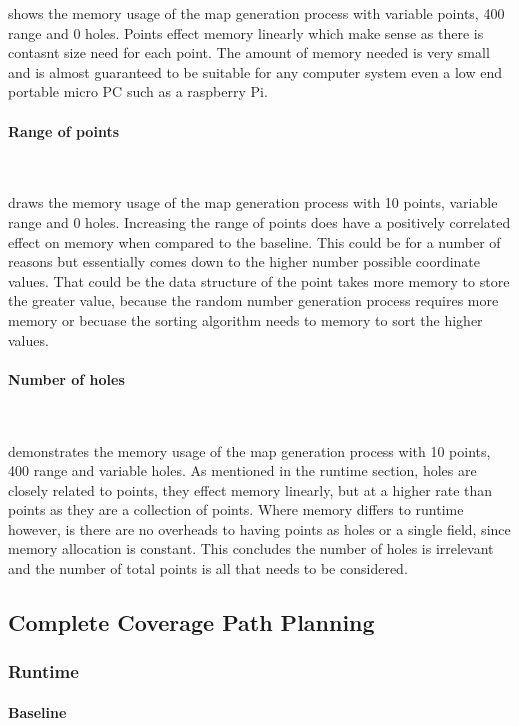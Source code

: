 \documentclass[final]{cmpreport_02}
\begin{document}
 shows the memory usage of the map generation process with variable points, 400 range and 0 holes.
Points effect memory linearly which make sense as there is contasnt size need for each point.
The amount of memory needed is very small and is almost guaranteed to be suitable for any computer system even a low end portable micro PC such as a raspberry Pi.


\paragraph{Range of points} \

 draws the memory usage of the map generation process with 10 points, variable range and 0 holes.
Increasing the range of points does have a positively correlated effect on memory when compared to the baseline.
This could be for a number of reasons but essentially comes down to the higher number possible coordinate values.
That could be the data structure of the point takes more memory to store the greater value, because the random number generation process requires more memory or becuase the sorting algorithm needs to memory to sort the higher values.

\paragraph{Number of holes} \

 demonstrates the memory usage of the map generation process with 10 points, 400 range and variable holes.
As mentioned in the runtime section, holes are closely related to points, they effect memory linearly, but at a higher rate than points as they are a collection of points.
Where memory differs to runtime however, is there are no overheads to having points as holes or a single field, since memory allocation is constant.
This concludes the number of holes is irrelevant and the number of total points is all that needs to be considered.


\subsection{Complete Coverage Path Planning}
\subsubsection{Runtime}
\paragraph{Baseline} \
\end{document}
